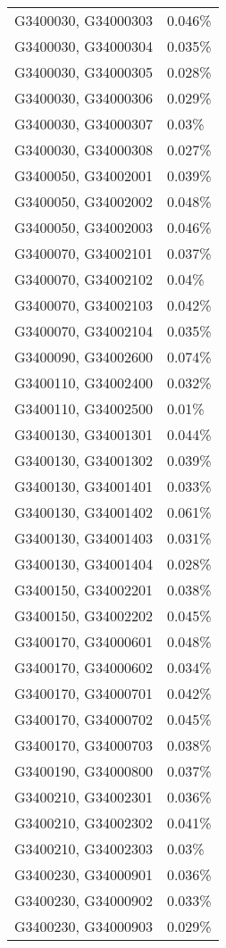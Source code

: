 \begin{longtable}[]{@{}ll@{}}
G3400030, G34000303 & 0.046\% \\
G3400030, G34000304 & 0.035\% \\
G3400030, G34000305 & 0.028\% \\
G3400030, G34000306 & 0.029\% \\
G3400030, G34000307 & 0.03\% \\
G3400030, G34000308 & 0.027\% \\
G3400050, G34002001 & 0.039\% \\
G3400050, G34002002 & 0.048\% \\
G3400050, G34002003 & 0.046\% \\
G3400070, G34002101 & 0.037\% \\
G3400070, G34002102 & 0.04\% \\
G3400070, G34002103 & 0.042\% \\
G3400070, G34002104 & 0.035\% \\
G3400090, G34002600 & 0.074\% \\
G3400110, G34002400 & 0.032\% \\
G3400110, G34002500 & 0.01\% \\
G3400130, G34001301 & 0.044\% \\
G3400130, G34001302 & 0.039\% \\
G3400130, G34001401 & 0.033\% \\
G3400130, G34001402 & 0.061\% \\
G3400130, G34001403 & 0.031\% \\
G3400130, G34001404 & 0.028\% \\
G3400150, G34002201 & 0.038\% \\
G3400150, G34002202 & 0.045\% \\
G3400170, G34000601 & 0.048\% \\
G3400170, G34000602 & 0.034\% \\
G3400170, G34000701 & 0.042\% \\
G3400170, G34000702 & 0.045\% \\
G3400170, G34000703 & 0.038\% \\
G3400190, G34000800 & 0.037\% \\
G3400210, G34002301 & 0.036\% \\
G3400210, G34002302 & 0.041\% \\
G3400210, G34002303 & 0.03\% \\
G3400230, G34000901 & 0.036\% \\
G3400230, G34000902 & 0.033\% \\
G3400230, G34000903 & 0.029\% \\

\end{longtable}
